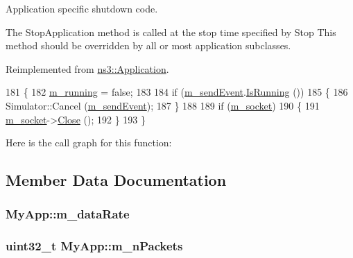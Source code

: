 Application specific shutdown code. 

The Stop\+Application method is called at the stop time specified by Stop This method should be overridden by all or most application subclasses. 

Reimplemented from \hyperlink{classns3_1_1Application_aea844f3c114b1faf8de1faf5127ea8b4}{ns3\+::\+Application}.


\begin{DoxyCode}
181 \{
182   \hyperlink{classMyApp_a4311ddcd651074787e37299609e831dc}{m\_running} = \textcolor{keyword}{false};
183 
184   \textcolor{keywordflow}{if} (\hyperlink{classMyApp_a1653da1094b140fdcd5319947dd463eb}{m\_sendEvent}.\hyperlink{classns3_1_1EventId_aabf8476d1a080c199ea0c6aa9ccea372}{IsRunning} ())
185     \{
186       Simulator::Cancel (\hyperlink{classMyApp_a1653da1094b140fdcd5319947dd463eb}{m\_sendEvent});
187     \}
188 
189   \textcolor{keywordflow}{if} (\hyperlink{classMyApp_a6393c163d35660b22b57b61b61d109a4}{m\_socket})
190     \{
191       \hyperlink{classMyApp_a6393c163d35660b22b57b61b61d109a4}{m\_socket}->\hyperlink{classns3_1_1Socket_abdac6e2498c5aa2963ef361d4200ddf3}{Close} ();
192     \}
193 \}
\end{DoxyCode}


Here is the call graph for this function\+:




\subsection{Member Data Documentation}
\subsubsection[{\texorpdfstring{m\+\_\+data\+Rate}{m_dataRate}}]{ My\+App\+::m\+\_\+data\+Rate\hspace{0.3cm}{\ttfamily [private]}}\hypertarget{classMyApp_a1c20ca07aca3a4860f10ee937193d7fb}{}\label{classMyApp_a1c20ca07aca3a4860f10ee937193d7fb}
\subsubsection[{\texorpdfstring{m\+\_\+n\+Packets}{m_nPackets}}]{\setlength{\rightskip}{0pt plus 5cm}uint32\+\_\+t My\+App\+::m\+\_\+n\+Packets\hspace{0.3cm}{\ttfamily [private]}}\hypertarget{classMyApp_ab9b20c89c08a1a8ecbaaed46094b7794}{}\label{classMyApp_ab9b20c89c08a1a8ecbaaed46094b7794}

